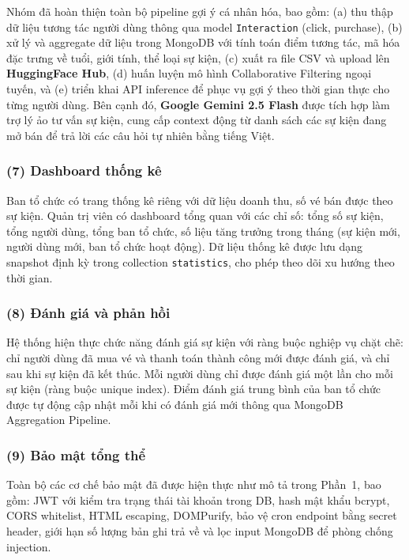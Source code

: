 \indent \indent Nhóm đã hoàn thiện toàn bộ pipeline gợi ý cá nhân hóa, bao gồm: (a) thu thập
dữ liệu tương tác người dùng thông qua model \texttt{Interaction} (click, purchase),
(b) xử lý và aggregate dữ liệu trong MongoDB với tính toán điểm tương tác,
mã hóa đặc trưng về tuổi, giới tính, thể loại sự kiện, (c) xuất ra file CSV
và upload lên \textbf{HuggingFace Hub}, (d) huấn luyện mô hình Collaborative Filtering
ngoại tuyến, và (e) triển khai API inference để phục vụ gợi ý theo thời gian thực
cho từng người dùng. Bên cạnh đó, \textbf{Google Gemini 2.5 Flash} được tích hợp
làm trợ lý ảo tư vấn sự kiện, cung cấp context động từ danh sách các sự kiện
đang mở bán để trả lời các câu hỏi tự nhiên bằng tiếng Việt.

\subsubsection*{(7) Dashboard thống kê}

\indent \indent Ban tổ chức có trang thống kê riêng với dữ liệu doanh thu, số vé bán được
theo sự kiện. Quản trị viên có dashboard tổng quan với các chỉ số: tổng số
sự kiện, tổng người dùng, tổng ban tổ chức, số liệu tăng trưởng trong tháng
(sự kiện mới, người dùng mới, ban tổ chức hoạt động). Dữ liệu thống kê
được lưu dạng snapshot định kỳ trong collection \texttt{statistics}, cho
phép theo dõi xu hướng theo thời gian.

\subsubsection*{(8) Đánh giá và phản hồi}

\indent \indent Hệ thống hiện thực chức năng đánh giá sự kiện với ràng buộc nghiệp vụ chặt
chẽ: chỉ người dùng đã mua vé và thanh toán thành công mới được đánh giá,
và chỉ sau khi sự kiện đã kết thúc. Mỗi người dùng chỉ được đánh giá một
lần cho mỗi sự kiện (ràng buộc unique index). Điểm đánh giá trung bình của
ban tổ chức được tự động cập nhật mỗi khi có đánh giá mới thông qua
MongoDB Aggregation Pipeline.

\subsubsection*{(9) Bảo mật tổng thể}

\indent \indent Toàn bộ các cơ chế bảo mật đã được hiện thực như mô tả trong Phần~1, bao
gồm: JWT với kiểm tra trạng thái tài khoản trong DB, hash mật khẩu bcrypt,
CORS whitelist, HTML escaping, DOMPurify, bảo vệ cron endpoint bằng secret
header, giới hạn số lượng bản ghi trả về và lọc input MongoDB để phòng
chống injection.

